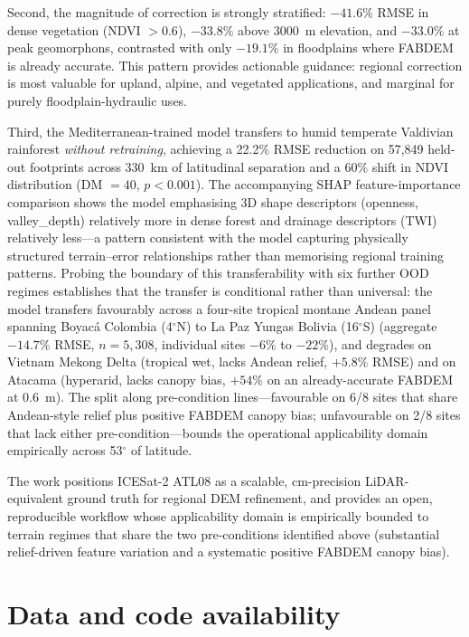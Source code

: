 \documentclass[preprint,authoryear,number]{elsarticle}
\begin{document}
Second, the magnitude of correction is strongly stratified: $-41.6\%$ RMSE in dense vegetation (NDVI $> 0.6$), $-33.8\%$ above \SI{3000}{\meter} elevation, and $-33.0\%$ at peak geomorphons, contrasted with only $-19.1\%$ in floodplains where FABDEM is already accurate. This pattern provides actionable guidance: regional correction is most valuable for upland, alpine, and vegetated applications, and marginal for purely floodplain-hydraulic uses.

Third, the Mediterranean-trained model transfers to humid temperate Valdivian rainforest \emph{without retraining}, achieving a 22.2\% RMSE reduction on 57{,}849 held-out footprints across \SI{330}{\kilo\meter} of latitudinal separation and a 60\% shift in NDVI distribution (DM $= 40$, $p < 0.001$). The accompanying SHAP feature-importance comparison shows the model emphasising 3D shape descriptors (openness, valley\_depth) relatively more in dense forest and drainage descriptors (TWI) relatively less---a pattern consistent with the model capturing physically structured terrain--error relationships rather than memorising regional training patterns. Probing the boundary of this transferability with six further OOD regimes establishes that the transfer is conditional rather than universal: the model transfers favourably across a four-site tropical montane Andean panel spanning Boyac\'a Colombia (4$^{\circ}$N) to La Paz Yungas Bolivia (16$^{\circ}$S) (aggregate $-14.7\%$ RMSE, $n=5{,}308$, individual sites $-6\%$ to $-22\%$), and degrades on Vietnam Mekong Delta (tropical wet, lacks Andean relief, $+5.8\%$ RMSE) and on Atacama (hyperarid, lacks canopy bias, $+54\%$ on an already-accurate FABDEM at \SI{0.6}{\meter}). The split along pre-condition lines---favourable on 6/8 sites that share Andean-style relief plus positive FABDEM canopy bias; unfavourable on 2/8 sites that lack either pre-condition---bounds the operational applicability domain empirically across 53$^{\circ}$ of latitude.

The work positions ICESat-2 ATL08 as a scalable, cm-precision LiDAR-equivalent ground truth for regional DEM refinement, and provides an open, reproducible workflow whose applicability domain is empirically bounded to terrain regimes that share the two pre-conditions identified above (substantial relief-driven feature variation and a systematic positive FABDEM canopy bias).


\section{Data and code availability}
\label{sec:data_availability}
\end{document}
